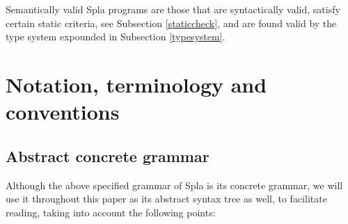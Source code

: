 \documentclass[english,10pt]{article} %
\theoremstyle{definitionstyle}
\theoremstyle{lemmastyle}
\begin{document}
Semantically valid Spla programs are those that are syntactically valid, satisfy certain static criteria, see Subsection \ref{staticcheck}, and are found valid by the type system expounded in Subsection \ref{typesystem}.


\section{Notation, terminology and conventions}

\subsection{Abstract concrete grammar}

Although the above specified grammar of Spla is its concrete grammar, we will use it throughout this paper as its abstract syntax tree as well, to facilitate reading, taking into account the following points:
\end{document}
